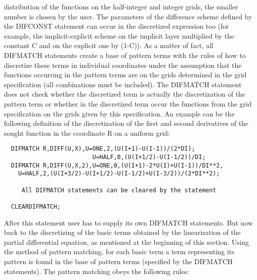 distribution of the functions on the half-integer and integer grids, the
smaller number is chosen by the user.  The parameters  of the difference
scheme defined  by the  DIFCONST statement  can occur in the discretized
expression  too  (for  example,  the  implicit-explicit  scheme  on  the
implicit layer  multiplied by  the constant C and on the explicit one by
(1-C)).  As a matter of fact, all DIFMATCH statements  create a  base of
pattern  terms  with  the  rules  of  how  to  discretize these terms in
individual coordinates under the assumption that the functions occurring
in  the   pattern  terms  are  on  the  grids  determined  in  the  grid
specification (all combinations must be included).
     The DIFMATCH statement does not check whether the  discretized term
is actually  the discretization  of the  pattern term  or whether in the
discretized term occur the functions from the grid  specification on the
grids  given  by  this  specification.  An  example can be the following
definition of the discretization of the first and  second derivatives of
the sought function in the coordinate R on a uniform grid:
\begin{verbatim}
  DIFMATCH R,DIFF(U,X),U=ONE,2,(U(I+1)-U(I-1))/(2*DI);
                         U=HALF,0,(U(I+1/2)-U(I-1/2))/DI;
  DIFMATCH R,DIFF(U,X,2),U=ONE,0,(U(I+1)-2*U(I)+U(I-1))/DI**2,
    U=HALF,2,(U(I+3/2)-U(I+1/2)-U(I-1/2)+U(I-3/2))/(2*DI**2);

     All DIFMATCH statements can be cleared by the statement

  CLEARDIFMATCH;
\end{verbatim}
After this statement user has to supply its own DIFMATCH statements.
     But now back to the discretizing of the basic terms obtained by the
linearization of the partial differential equation, as mentioned  at the
beginning of  this section.  Using the  method of  pattern matching, for
each basic term a term representing its pattern is found in the  base of
pattern  terms  (specified  by  the  DIFMATCH  statements).  The pattern
matching obeys the following rules:
